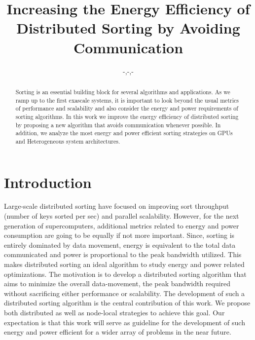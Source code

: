\documentclass{sig-alternate}
\begin{document}
%

\title{Increasing the Energy Efficiency of Distributed Sorting by Avoiding Communication}


\author{
  -,-,-
}

\maketitle
\begin{abstract}
Sorting is an essential building block for several algorithms and applications. As we ramp up to the first exascale systems, it is important to look beyond the usual metrics of performance and scalability and also consider the energy and power requirements of sorting algorithms. 
In this work we improve the energy efficiency of distributed sorting by proposing a new algorithm that avoids communication whenever possible. In addition, we analyze the most energy and power efficient sorting strategies on GPUs and Heterogeneous system architectures.
\end{abstract}




\section{Introduction}

Large-scale distributed sorting have focused on improving sort throughput (number of keys sorted per sec) and parallel scalability. However, for the next generation of supercomputers, additional metrics related to energy and power consumption are going to be equally if not more important. Since, sorting is entirely dominated by data movement, energy is equivalent to the total data communicated and power is proportional to the peak bandwidth utilized. This makes distributed sorting an ideal algorithm to study energy and power related optimizations. The motivation is to develop a distributed sorting algorithm that aims to minimize the overall data-movement, the peak bandwidth required without sacrificing either performance or scalability. The development of such a distributed sorting algorithm is the central contribution of this work. We propose both distributed as well as node-local strategies to achieve this goal. Our expectation is that this work will serve as guideline for the development of such energy and power efficient for a wider array of problems in the near future.
\end{document}
